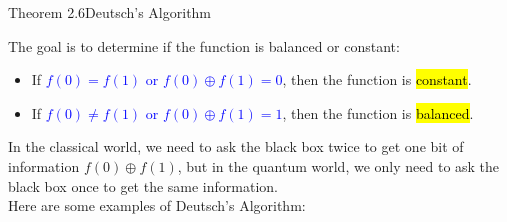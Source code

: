 \documentclass{book}
\begin{document}
\begin{thmBox}{Theorem 2.6}{Deutsch's Algorithm}
\begin{center}
    \end{center}
    The goal is to determine if the function is balanced or constant:
    \begin{itemize}
        \item If \textcolor{blue}{$f(0) = f(1)$ or $f(0) \oplus f(1) = 0$}, then the function is \hl{constant}.
        \item If \textcolor{blue}{$f(0) \neq f(1)$ or $f(0) \oplus f(1) = 1$}, then the function is \hl{balanced}.
    \end{itemize}
\end{thmBox}
In the classical world, we need to ask the black box twice to get one bit of information $f(0) \oplus f(1)$, but in the quantum world, we only need to ask the black box once to get the same information.\\
\vspace{1mm}
Here are some examples of Deutsch's Algorithm:
\end{document}
